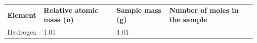 \begin{enumerate}[noitemsep, label=\textbf{\arabic*}. ]
{\begin{tabular}[t]{|l|l|l|l|}
    
        \textbf{Element} &
    
    
        \textbf{Relative atomic mass (u)} &
    
    
        \textbf{Sample mass (g)} &
    
    
        \textbf{Number of moles in the sample}%
     \tabularnewline\cline{1-1}\cline{2-2}\cline{3-3}\cline{4-4}
    
    
        Hydrogen &
    
    
        1.01 &
    
    
        1.01 &
    
    
     \tabularnewline\cline{1-1}\cline{2-2}\cline{3-3}\cline{4-4}
    

\end{tabular}}
\end{enumerate}
